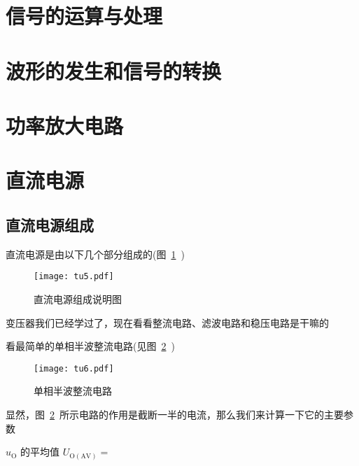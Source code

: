 \documentclass[cn,pad,11pt,geye]{elegantnote}
\begin{document}
\section{信号的运算与处理}
\section{波形的发生和信号的转换}
\section{功率放大电路}
\section{直流电源}
\subsection{直流电源组成}
	直流电源是由以下几个部分组成的(图~\ref{tu:5}~)
	\begin{figure}[htbp]
		\centering
		\texttt{[image: tu5.pdf]}
		\caption{直流电源组成说明图}\label{tu:5}
	\end{figure}
	变压器我们已经学过了，现在看看整流电路、滤波电路和稳压电路是干嘛的

	看最简单的单相半波整流电路(见图~\ref{tu:6}~)
	\begin{figure}[htbp]
		\centering
		\texttt{[image: tu6.pdf]}
		\caption{单相半波整流电路}\label{tu:6}
	\end{figure}

	显然，图~\ref{tu:6}~所示电路的作用是截断一半的电流，那么我们来计算一下它的主要参数

	$u_{\mathrm{O}}$ 的平均值 $U_{\mathrm{O(AV)}}=$
\end{document}
